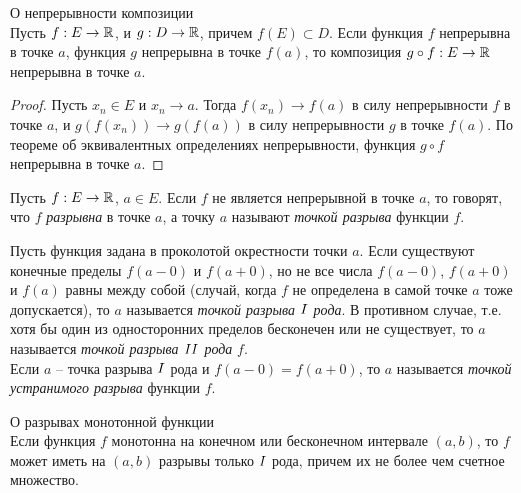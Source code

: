     \begin{theorem}{О непрерывности композиции}\\
        Пусть $f: E \to \mathbb{R}$, и $g: D \to \mathbb{R}$, причем $f(E) \subset D$. Если функция $f$ непрерывна в точке $a$, функция $g$ непрерывна в точке $f(a)$, то композиция $g \circ f: E \to \mathbb{R}$ непрерывна в точке $a$.
    \end{theorem}

    \begin{proof}
        Пусть $x_{n} \in E$ и $x_{n} \to a$. Тогда $f(x_{n}) \to f(a)$ в силу непрерывности $f$ в точке $a$, и $g(f(x_{n})) \to g(f(a))$ в силу непрерывности $g$ в точке $f(a)$. По теореме об эквивалентных определениях непрерывности, функция $g\circ f$ непрерывна в точке $a$.
    \end{proof}

    \begin{definition}
        Пусть $f: E \to \mathbb{R}$, $a \in E$. Если $f$ не является непрерывной в точке $a$, то говорят, что $f$ \textit{разрывна} в точке $a$, а точку $a$ называют \textit{точкой разрыва} функции $f$. 
    \end{definition}

    Пусть функция задана в проколотой окрестности точки $a$. Если существуют конечные пределы $f(a - 0)$ и $f(a + 0)$, но не все числа $f(a - 0)$, $f(a + 0)$ и $f(a)$ равны между собой (случай, когда $f$ не определена в самой точке $a$ тоже допускается), то $a$ называется \textit{точкой разрыва ${\MakeUppercase{\romannumeral 1}}$ рода}. В противном случае, т.е. хотя бы один из односторонних пределов бесконечен или не существует, то $a$ называется \textit{точкой разрыва ${\MakeUppercase{\romannumeral 2}}$ рода} $f$.\\
    Если $a$ -- точка разрыва ${\MakeUppercase{\romannumeral 1}}$ рода и $f(a - 0) = f(a + 0)$, то $a$ называется \textit{точкой устранимого разрыва} функции $f$.

    \begin{theorem}{О разрывах монотонной функции}\\
        Если функция $f$ монотонна на конечном или бесконечном интервале $(a, b)$, то $f$ может иметь на $(a, b)$ разрывы только ${\MakeUppercase{\romannumeral 1}}$ рода, причем их не более чем счетное множество.
    \end{theorem}

